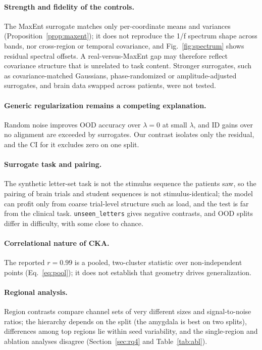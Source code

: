\documentclass[conference]{IEEEtran}
\begin{document}
\paragraph{Strength and fidelity of the controls.}
The MaxEnt surrogate matches only per-coordinate means and variances (Proposition~\ref{prop:maxent}); it does not reproduce the 1/f spectrum shape across bands, nor cross-region or temporal covariance, and Fig.~\ref{fig:spectrum} shows residual spectral offsets. A real-versus-MaxEnt gap may therefore reflect covariance structure that is unrelated to task content. Stronger surrogates, such as covariance-matched Gaussians, phase-randomized or amplitude-adjusted surrogates, and brain data swapped across patients, were not tested.

\paragraph{Generic regularization remains a competing explanation.}
Random noise improves OOD accuracy over $\lambda=0$ at small $\lambda$, and ID gains over no alignment are exceeded by surrogates. Our contrast isolates only the residual, and the CI for it excludes zero on one split.

\paragraph{Surrogate task and pairing.}
The synthetic letter-set task is not the stimulus sequence the patients saw, so the pairing of brain trials and student sequences is not stimulus-identical; the model can profit only from coarse trial-level structure such as load, and the test is far from the clinical task. \texttt{unseen\_letters} gives negative contrasts, and OOD splits differ in difficulty, with some close to chance.

\paragraph{Correlational nature of CKA.}
The reported $r=0.99$ is a pooled, two-cluster statistic over non-independent points (Eq.~\eqref{eq:pool}); it does not establish that geometry drives generalization.

\paragraph{Regional analysis.}
Region contrasts compare channel sets of very different sizes and signal-to-noise ratios; the hierarchy depends on the split (the amygdala is best on two splits), differences among top regions lie within seed variability, and the single-region and ablation analyses disagree (Section~\ref{sec:rq4} and Table~\ref{tab:abl}).
\end{document}
